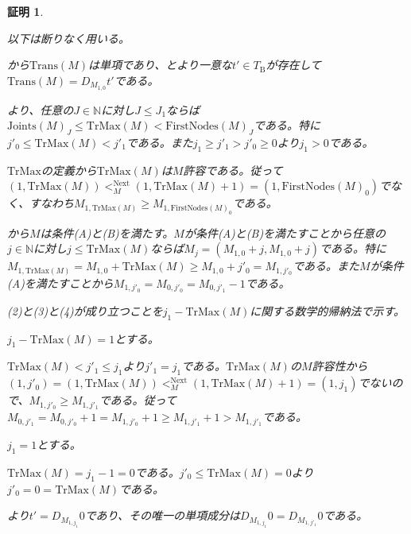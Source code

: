 \documentclass[dvipdfmx,uplatex]{jsarticle}
\theoremstyle{customnonumberbreakfortheorem}
\theoremstyle{customnonumberbreakforproof}
\newtheorem{hideableproof}{証明}
\begin{document}
\begin{hideableproof}
	\begin{indented}
		\item 以下は断りなく用いる。
		\item {}から\(\textrm{Trans}(M)\)は単項であり、とより一意な\(t' \in T_{\textrm{B}}\)が存在して\(\textrm{Trans}(M) = D_{M_{1,0}} t'\)である。
		\item {}より、任意の\(J \in \mathbb{N}\)に対し\(J \leq J_1\)ならば\(\textrm{Joints}(M)_J \leq \textrm{TrMax}(M) < \textrm{FirstNodes}(M)_J\)である。特に\(j'_0 \leq\textrm{TrMax}(M) < j'_1\)である。また\(j_1 \geq j'_1 > j'_0 \geq 0\)より\(j_1 > 0\)である。
		\item \(\textrm{TrMax}\)の定義から\(\textrm{TrMax}(M)\)は\(M\)許容である。従って\((1,\textrm{TrMax}(M)) <_M^{\textrm{Next}} (1,\textrm{TrMax}(M)+1) = (1,\textrm{FirstNodes}(M)_0)\)でなく、すなわち\(M_{1,\textrm{TrMax}(M)} \geq M_{1,\textrm{FirstNodes}(M)_0}\)である。
		\item {}から\(M\)は条件(A)と(B)を満たす。\(M\)が条件(A)と(B)を満たすことから任意の\(j \in \mathbb{N}\)に対し\(j \leq \textrm{TrMax}(M)\)ならば\(M_j = (M_{1,0} + j, M_{1,0} + j)\)である。特に\(M_{1,\textrm{TrMax}(M)} = M_{1,0} + \textrm{TrMax}(M) \geq M_{1,0} + j'_0 = M_{1,j'_0}\)である。また\(M\)が条件(A)を満たすことから\(M_{1,j'_0} = M_{0,j'_0} = M_{0,j'_1}-1\)である。
		\item (2)と(3)と(4)が成り立つことを\(j_1 - \textrm{TrMax}(M)\)に関する数学的帰納法で示す。
		\item \(j_1 - \textrm{TrMax}(M) = 1\)とする。
		\begin{indented}
			\item \(\textrm{TrMax}(M) < j'_1 \leq j_1\)より\(j'_1 = j_1\)である。\(\textrm{TrMax}(M)\)の\(M\)許容性から\((1,j'_0) = (1,\textrm{TrMax}(M)) <_M^{\textrm{Next}} (1,\textrm{TrMax}(M)+1) = (1,j_1)\)でないので、\(M_{1,j'_0} \geq M_{1,j'_1}\)である。従って\(M_{0,j'_1} = M_{0,j'_0}+1 = M_{1,j'_0}+1 \geq M_{1,j'_1}+1 > M_{1,j'_1}\)である。
			\item \(j_1 = 1\)とする。
			\begin{indented}
				\item \(\textrm{TrMax}(M) = j_1-1 = 0\)である。\(j'_0 \leq \textrm{TrMax}(M) = 0\)より\(j'_0 = 0 = \textrm{TrMax}(M)\)である。
				\item {}より\(t' = D_{M_{1,j_1}} 0\)であり、その唯一の単項成分は\(D_{M_{1,j_1}} 0 = D_{M_{1,j'_1}} 0\)である。

\end{indented}
\end{indented}
\end{indented}
\end{hideableproof}
\end{document}
